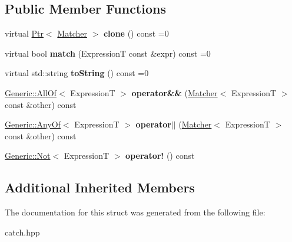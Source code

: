 \subsection*{Public Member Functions}
\begin{DoxyCompactItemize}
\item 
\mbox{\label{structCatch_1_1Matchers_1_1Impl_1_1Matcher_a9d31e5018fea24efa08c3cbf5aa4475d}} 
virtual \hyperlink{classCatch_1_1Ptr}{Ptr}$<$ \hyperlink{structCatch_1_1Matchers_1_1Impl_1_1Matcher}{Matcher} $>$ {\bfseries clone} () const =0
\item 
\mbox{\label{structCatch_1_1Matchers_1_1Impl_1_1Matcher_a8c1c5511ce1f3738a45e6901b558f583}} 
virtual bool {\bfseries match} (ExpressionT const \&expr) const =0
\item 
\mbox{\label{structCatch_1_1Matchers_1_1Impl_1_1Matcher_a091bcc37e589967d7e10fc7790d820e2}} 
virtual std\+::string {\bfseries to\+String} () const =0
\item 
\mbox{\label{structCatch_1_1Matchers_1_1Impl_1_1Matcher_adb060f348e3ed404b80209fbc62174e1}} 
\hyperlink{classCatch_1_1Matchers_1_1Impl_1_1Generic_1_1AllOf}{Generic\+::\+All\+Of}$<$ ExpressionT $>$ {\bfseries operator\&\&} (\hyperlink{structCatch_1_1Matchers_1_1Impl_1_1Matcher}{Matcher}$<$ ExpressionT $>$ const \&other) const
\item 
\mbox{\label{structCatch_1_1Matchers_1_1Impl_1_1Matcher_a55b1e12315e7a5daf7ce7a11ddfaa295}} 
\hyperlink{classCatch_1_1Matchers_1_1Impl_1_1Generic_1_1AnyOf}{Generic\+::\+Any\+Of}$<$ ExpressionT $>$ {\bfseries operator$\vert$$\vert$} (\hyperlink{structCatch_1_1Matchers_1_1Impl_1_1Matcher}{Matcher}$<$ ExpressionT $>$ const \&other) const
\item 
\mbox{\label{structCatch_1_1Matchers_1_1Impl_1_1Matcher_a7ecd56842090611c9dbfc325b42fa942}} 
\hyperlink{classCatch_1_1Matchers_1_1Impl_1_1Generic_1_1Not}{Generic\+::\+Not}$<$ ExpressionT $>$ {\bfseries operator!} () const
\end{DoxyCompactItemize}
\subsection*{Additional Inherited Members}


The documentation for this struct was generated from the following file\+:\begin{DoxyCompactItemize}
\item 
catch.\+hpp\end{DoxyCompactItemize}
